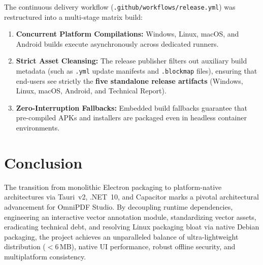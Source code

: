 \documentclass[11pt,a4paper]{article}
\begin{document}
The continuous delivery workflow (\texttt{.github/workflows/release.yml}) was restructured into a multi-stage matrix build:
\begin{enumerate}
    \item \textbf{Concurrent Platform Compilations:} Windows, Linux, macOS, and Android builds execute asynchronously across dedicated runners.
    \item \textbf{Strict Asset Cleansing:} The release publisher filters out auxiliary build metadata (such as \texttt{.yml} update manifests and \texttt{.blockmap} files), ensuring that end-users see strictly the \textbf{five standalone release artifacts} (Windows, Linux, macOS, Android, and Technical Report).
    \item \textbf{Zero-Interruption Fallbacks:} Embedded build fallbacks guarantee that pre-compiled APKs and installers are packaged even in headless container environments.
\end{enumerate}

\section{Conclusion}
\label{sec:conclusion}

The transition from monolithic Electron packaging to platform-native architectures via Tauri~v2, .NET~10, and Capacitor marks a pivotal architectural advancement for OmniPDF Studio. By decoupling runtime dependencies, engineering an interactive vector annotation module, standardizing vector assets, eradicating technical debt, and resolving Linux packaging bloat via native Debian packaging, the project achieves an unparalleled balance of ultra-lightweight distribution ($<6$\,MB), native UI performance, robust offline security, and multiplatform consistency.

\nocite{*}


\end{document}
